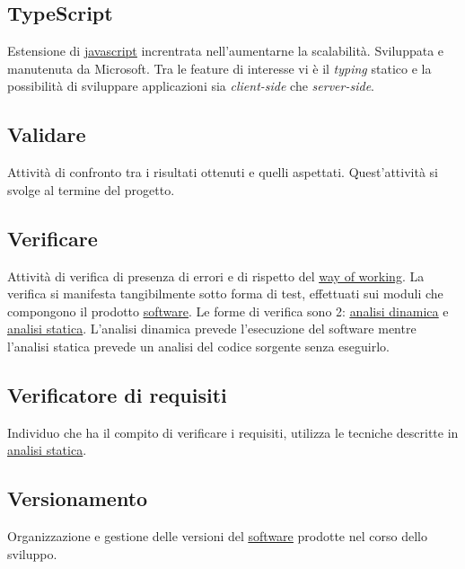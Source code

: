 	\subsection{TypeScript}
	\label{sec:typescript}
	Estensione di \underline{\hyperref[sec:javascript]{javascript}} increntrata nell'aumentarne la scalabilità. Sviluppata e manutenuta da Microsoft. Tra le feature di interesse vi è il \emph{typing} statico e la possibilità di sviluppare applicazioni sia \emph{client-side} che \emph{server-side}.

	\newpage


	\subsection{Validare}
	\label{sec:validare}
	Attività di confronto tra i risultati ottenuti e quelli aspettati. Quest'attività si svolge al termine del progetto.


	\subsection{Verificare}
	\label{sec:verificare}
	Attività di verifica di presenza di errori e di rispetto del \underline{\hyperref[sec:wow]{way of working}}. La verifica si manifesta tangibilmente sotto forma di test, effettuati sui moduli che compongono il prodotto \underline{\hyperref[sec:prodottosoftware]{software}}. Le forme di verifica sono 2: \hyperref[sec:analisidinamica]{\underline{analisi dinamica}} e \hyperref[sec:analisistatica]{\underline{analisi statica}}. L'analisi dinamica prevede l'esecuzione del software mentre l'analisi statica prevede un analisi del codice sorgente senza eseguirlo.


	\subsection{Verificatore di requisiti}
	\label{sec:verificatorerequisiti}
	Individuo che ha il compito di verificare i requisiti, utilizza le tecniche descritte in \underline{\hyperref[sec:analisistatica]{analisi statica}}.


	\subsection{Versionamento}
	\label{sec:versionamento}
	Organizzazione e gestione delle versioni del \underline{\hyperref[sec:prodottosoftware]{software}} prodotte nel corso dello sviluppo.


